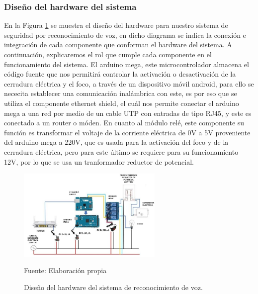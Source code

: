 \subsubsection{Diseño del hardware del sistema}
En la Figura \ref{fig:figura3.69} se muestra el diseño del hardware para nuestro sistema de seguridad por reconocimiento de voz, en dicho diagrama se indica la conexión e integración de cada componente que conforman el hardware del sistema. A continuación, explicaremos el rol que cumple cada componente en el funcionamiento del sistema.
\vskip 0.5cm
El arduino mega, este microcontrolador almacena el código fuente que nos permitirá controlar la activación o desactivación de la cerradura eléctrica y el foco, a través de un dispositivo móvil android, para ello se nececita establecer una comunicación inalámbrica con este, es por eso que se utiliza el componente ethernet shield, el cuál nos permite conectar el arduino mega a una red por medio de un cable UTP con entradas de tipo RJ45, y este es conectado a un router o móden.
\vskip 0.5cm
En cuanto al módulo relé, este componente su función es transformar el voltaje de la corriente eléctrica de 0V a 5V proveniente del arduino mega a 220V, que es usada para la activación del foco y de la cerradura eléctrica, pero para este último se requiere para su funcionamiento 12V, por lo que se usa un tranformador reductor de potencial.
\begin{figure}[H]
\captionsetup{justification=centering}
\begin{center}
\includegraphics[width=0.62\textwidth]{Imagenes/Cap3/image069}
\end{center}
\begin{center}
\vskip -0.5cm
\caption{\small{Diseño del hardware del sistema de reconocimiento de voz.}}
\label{fig:figura3.69}
{\small{Fuente: Elaboración propia}}
\end{center}
\end{figure}

